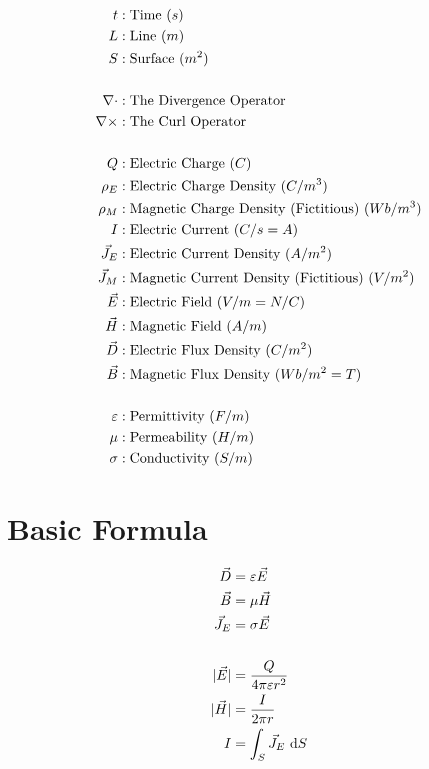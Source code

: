 \documentclass{article}
\begin{document}
	\begin{align*}
		\Time &: \text{Time} \ (s)
		\\
		\Line &: \text{Line} \ (m)
		\\
		\Surface &: \text{Surface} \ (m^2)
		\\
		\\
		\opDivergence &: \text{The Divergence Operator}
		\\
		\opCurl &: \text{The Curl Operator}
		\\
		\\
		\ElectricCharge &: \text{Electric Charge} \ (C)
		\\
		\ElectricChargeDensity &: \text{Electric Charge Density} \ (C/m^3)
		\\
		\MagneticChargeDensity &: \text{Magnetic Charge Density (Fictitious)} \ (Wb/m^3)
		\\
		\ElectricCurrent &: \text{Electric Current} \ (C/s = A)
		\\
		\ElectricCurrentDensity &: \text{Electric Current Density} \ (A/m^2)
		\\
		\MagneticCurrentDensity &: \text{Magnetic Current Density (Fictitious)} \ (V/m^2)
		\\
		\ElectricField &: \text{Electric Field} \ (V/m = N/C)
		\\
		\MagneticField &: \text{Magnetic Field} \ (A/m)
		\\
		\ElectricFluxDensity &: \text{Electric Flux Density} \ (C/m^2)
		\\
		\MagneticFluxDensity &: \text{Magnetic Flux Density} \ (Wb/m^2 = T)
		\\
		\\
		\Permittivity &: \text{Permittivity} \ (F/m)
		\\
		\Permeability &: \text{Permeability} \ (H/m)
		\\
		\Conductivity &: \text{Conductivity} \ (S/m)
	\end{align*}
	
	\section{Basic Formula}
	
	\begin{align*}
		\ElectricFluxDensity & = \Permittivity \ElectricField
		\\
		\MagneticFluxDensity & = \Permeability \MagneticField
		\\
		\ElectricCurrentDensity & = \Conductivity \ElectricField
		\\
		\\
		|\ElectricField| & = \frac{\ElectricCharge}{4 \pi \Permittivity r^2}
		\\
		|\MagneticField| & = \frac{\ElectricCurrent}{2 \pi r}
		\\
		\ElectricCurrent & = \int_\Surface \ElectricCurrentDensity \d[\Surface]
	\end{align*}
	
\end{document}

